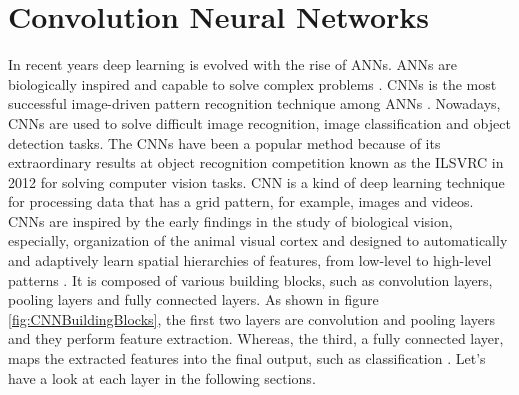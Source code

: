 \newpage
\section{Convolution Neural Networks}\label{CNNs}

In recent years deep learning is evolved with the rise of \acp{ANN}. \acp{ANN} are biologically inspired and capable to solve complex problems \cite{oshea2015introduction}. \acp{CNN} is the most successful image-driven pattern recognition technique among \acp{ANN} \cite{oshea2015introduction}. Nowadays, \acp{CNN} are used to solve difficult image recognition, image classification and object detection tasks. The \acp{CNN} have been a popular method because of its extraordinary results at object recognition competition known as the \ac{ILSVRC} in 2012 for solving computer vision tasks. \ac{CNN} is a kind of deep learning technique for processing data that has a grid pattern, for example, images and videos. \acp{CNN} are inspired by the early findings in the study of biological vision, especially, organization of the animal visual cortex \cite{Hubel.1968} \cite{Fukushima.1980} \cite{10.5555/3153997} and designed to automatically and adaptively learn spatial hierarchies of features, from low-level to high-level patterns \cite{10.5555/3153997}. It is composed of various building blocks, such as convolution layers, pooling layers and fully connected layers. As shown in figure \ref{fig:CNNBuildingBlocks}, the first two layers are convolution and pooling layers and they perform feature extraction. Whereas, the third, a fully connected layer, maps the extracted features into the final output, such as classification \cite{articleCNNs}. Let's have a look at each layer in the following sections.



